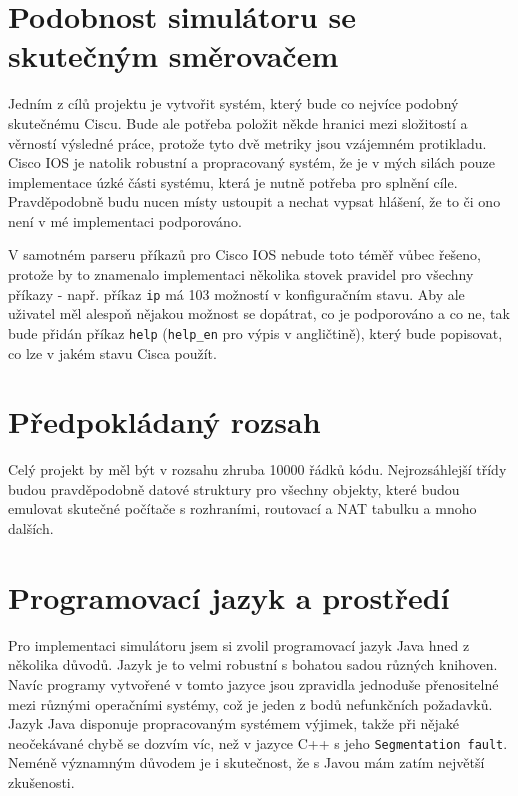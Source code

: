 
\section{Podobnost simulátoru se skutečným směrovačem}\label{kap:podobnost}
Jedním z cílů projektu je vytvořit systém, který bude co nejvíce podobný skutečnému Ciscu. Bude ale potřeba položit někde hranici mezi složitostí a věrností výsledné práce, protože tyto dvě metriky jsou vzájemném protikladu. Cisco IOS je natolik robustní a propracovaný systém, že je v mých silách pouze implementace úzké části systému, která je nutně potřeba pro splnění cíle. Pravděpodobně budu nucen místy ustoupit a nechat vypsat hlášení, že to či ono není v mé implementaci podporováno. 

V samotném parseru příkazů pro Cisco IOS nebude toto téměř vůbec řešeno, protože by to znamenalo implementaci několika stovek pravidel pro všechny příkazy - např. příkaz \verb|ip| má 103 možností v konfiguračním stavu. Aby ale uživatel měl alespoň nějakou možnost se dopátrat, co je podporováno a co ne, tak bude přidán příkaz \verb|help| (\verb|help_en| pro výpis v angličtině), který bude popisovat, co lze v jakém stavu Cisca použít.


\section{Předpokládaný rozsah}
Celý projekt by měl být v rozsahu zhruba 10000 řádků kódu. Nejrozsáhlejší třídy budou pravděpodobně datové struktury pro všechny objekty, které budou emulovat skutečné počítače s rozhraními, routovací a NAT tabulku a mnoho dalších.


\section{Programovací jazyk a prostředí}
Pro implementaci simulátoru jsem si zvolil programovací jazyk Java hned z několika důvodů. Jazyk je to velmi robustní s bohatou sadou různých knihoven. Navíc programy vytvořené v tomto jazyce jsou zpravidla jednoduše přenositelné mezi různými operačními systémy, což je jeden z bodů nefunkčních požadavků. Jazyk Java disponuje propracovaným systémem výjimek, takže při nějaké neočekávané chybě se dozvím víc, než v jazyce C++ s jeho \verb|Segmentation fault|. Neméně významným důvodem je i skutečnost, že s Javou mám zatím největší zkušenosti.


